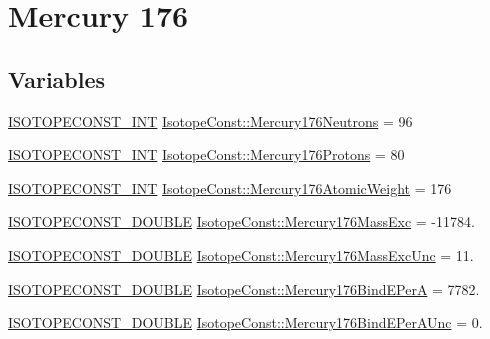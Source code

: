\hypertarget{group___isotope_const-_mercury-_hg176}{}\section{Mercury 176}
\label{group___isotope_const-_mercury-_hg176}
\subsection*{Variables}
\begin{DoxyCompactItemize}
\item 
\mbox{\hyperlink{group___isotope_const-_macros_ga5f18360b3e99483a35c32d789e62621c}{I\+S\+O\+T\+O\+P\+E\+C\+O\+N\+S\+T\+\_\+\+I\+NT}} \mbox{\hyperlink{group___isotope_const-_mercury-_hg176_ga3af9affefbf23a54fa60c1fd41350b89}{Isotope\+Const\+::\+Mercury176\+Neutrons}} = 96
\item 
\mbox{\hyperlink{group___isotope_const-_macros_ga5f18360b3e99483a35c32d789e62621c}{I\+S\+O\+T\+O\+P\+E\+C\+O\+N\+S\+T\+\_\+\+I\+NT}} \mbox{\hyperlink{group___isotope_const-_mercury-_hg176_gacdfb43cbb8f501927cebb88d50ac988d}{Isotope\+Const\+::\+Mercury176\+Protons}} = 80
\item 
\mbox{\hyperlink{group___isotope_const-_macros_ga5f18360b3e99483a35c32d789e62621c}{I\+S\+O\+T\+O\+P\+E\+C\+O\+N\+S\+T\+\_\+\+I\+NT}} \mbox{\hyperlink{group___isotope_const-_mercury-_hg176_ga780839db64801911be8c0231ff7e1e53}{Isotope\+Const\+::\+Mercury176\+Atomic\+Weight}} = 176
\item 
\mbox{\hyperlink{group___isotope_const-_macros_ga8f45a7272ce02c0b4c65c44636ed719a}{I\+S\+O\+T\+O\+P\+E\+C\+O\+N\+S\+T\+\_\+\+D\+O\+U\+B\+LE}} \mbox{\hyperlink{group___isotope_const-_mercury-_hg176_ga57501bceec8976546a79ecaa3c401028}{Isotope\+Const\+::\+Mercury176\+Mass\+Exc}} = -\/11784.
\item 
\mbox{\hyperlink{group___isotope_const-_macros_ga8f45a7272ce02c0b4c65c44636ed719a}{I\+S\+O\+T\+O\+P\+E\+C\+O\+N\+S\+T\+\_\+\+D\+O\+U\+B\+LE}} \mbox{\hyperlink{group___isotope_const-_mercury-_hg176_ga4f49969b84cae6fd90a1d1ab1a5d3359}{Isotope\+Const\+::\+Mercury176\+Mass\+Exc\+Unc}} = 11.
\item 
\mbox{\hyperlink{group___isotope_const-_macros_ga8f45a7272ce02c0b4c65c44636ed719a}{I\+S\+O\+T\+O\+P\+E\+C\+O\+N\+S\+T\+\_\+\+D\+O\+U\+B\+LE}} \mbox{\hyperlink{group___isotope_const-_mercury-_hg176_gabc27bc2720d230d2c4612990c0870f35}{Isotope\+Const\+::\+Mercury176\+Bind\+E\+PerA}} = 7782.
\item 
\mbox{\hyperlink{group___isotope_const-_macros_ga8f45a7272ce02c0b4c65c44636ed719a}{I\+S\+O\+T\+O\+P\+E\+C\+O\+N\+S\+T\+\_\+\+D\+O\+U\+B\+LE}} \mbox{\hyperlink{group___isotope_const-_mercury-_hg176_gac99d4a1c198ef5b7b2f7d6e312e880b5}{Isotope\+Const\+::\+Mercury176\+Bind\+E\+Per\+A\+Unc}} = 0.

\end{DoxyCompactItemize}
